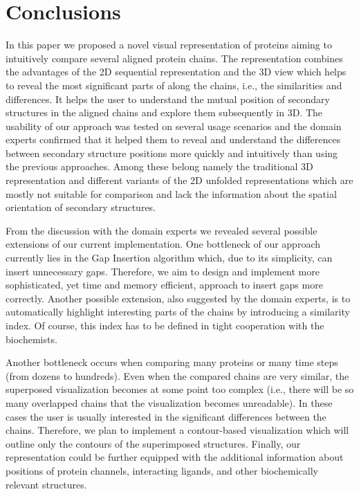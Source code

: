 \documentclass[twocolumn]{bmcart}%
\begin{document}
\section*{Conclusions}
In this paper we proposed a novel visual representation of proteins aiming to intuitively compare several aligned protein chains.
The representation combines the advantages of the 2D sequential representation and the 3D view which helps to reveal the most significant parts of along the chains, i.e., the similarities and differences. 
It helps the user to understand the mutual position of secondary structures in the aligned chains and explore them subsequently in 3D.
The usability of our approach was tested on several usage scenarios and the domain experts confirmed that it helped them to reveal and understand the differences between secondary structure positions more quickly and intuitively than using the previous approaches.
Among these belong namely the traditional 3D representation and different variants of the 2D unfolded representations which are mostly not suitable for comparison and lack the information about the spatial orientation of secondary structures.

From the discussion with the domain experts we revealed several possible extensions of our current implementation.
One bottleneck of our approach currently lies in the Gap Insertion algorithm which, due to its simplicity, can insert unnecessary gaps.
Therefore, we aim to design and implement more sophisticated, yet time and memory efficient, approach to insert gaps more correctly.
Another possible extension, also suggested by the domain experts, is to automatically highlight interesting parts of the chains by introducing a similarity index.
Of course, this index has to be defined in tight cooperation with the biochemists.

Another bottleneck occurs when comparing many proteins or many time steps (from dozens to hundreds).
Even when the compared chains are very similar, the superposed visualization becomes at some point too complex (i.e., there will be so many overlapped chains that the visualization becomes unreadable).
In these cases the user is usually interested in the significant differences between the chains.
Therefore, we plan to implement a contour-based visualization which will outline only the contours of the superimposed structures.
Finally, our representation could be further equipped with the additional information about positions of protein channels, interacting ligands, and other biochemically relevant structures.
\end{document}
